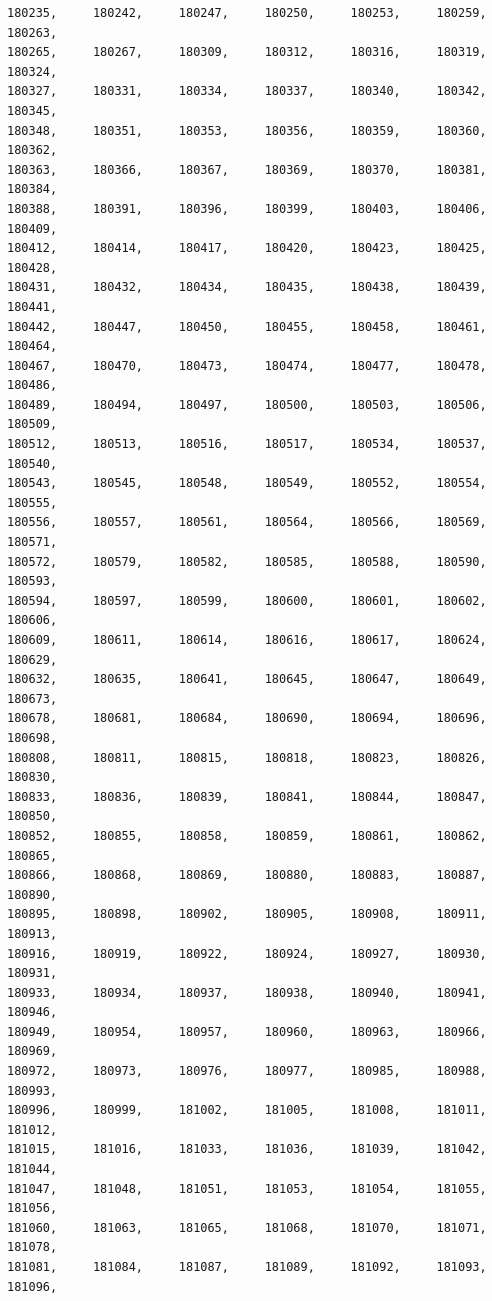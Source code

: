 \documentclass[a4paper,11pt]{report}
\begin{document}
\begin{verbatim}
180235,     180242,     180247,     180250,     180253,     180259,     180263,
180265,     180267,     180309,     180312,     180316,     180319,     180324,
180327,     180331,     180334,     180337,     180340,     180342,     180345,
180348,     180351,     180353,     180356,     180359,     180360,     180362,
180363,     180366,     180367,     180369,     180370,     180381,     180384,
180388,     180391,     180396,     180399,     180403,     180406,     180409,
180412,     180414,     180417,     180420,     180423,     180425,     180428,
180431,     180432,     180434,     180435,     180438,     180439,     180441,
180442,     180447,     180450,     180455,     180458,     180461,     180464,
180467,     180470,     180473,     180474,     180477,     180478,     180486,
180489,     180494,     180497,     180500,     180503,     180506,     180509,
180512,     180513,     180516,     180517,     180534,     180537,     180540,
180543,     180545,     180548,     180549,     180552,     180554,     180555,
180556,     180557,     180561,     180564,     180566,     180569,     180571,
180572,     180579,     180582,     180585,     180588,     180590,     180593,
180594,     180597,     180599,     180600,     180601,     180602,     180606,
180609,     180611,     180614,     180616,     180617,     180624,     180629,
180632,     180635,     180641,     180645,     180647,     180649,     180673,
180678,     180681,     180684,     180690,     180694,     180696,     180698,
180808,     180811,     180815,     180818,     180823,     180826,     180830,
180833,     180836,     180839,     180841,     180844,     180847,     180850,
180852,     180855,     180858,     180859,     180861,     180862,     180865,
180866,     180868,     180869,     180880,     180883,     180887,     180890,
180895,     180898,     180902,     180905,     180908,     180911,     180913,
180916,     180919,     180922,     180924,     180927,     180930,     180931,
180933,     180934,     180937,     180938,     180940,     180941,     180946,
180949,     180954,     180957,     180960,     180963,     180966,     180969,
180972,     180973,     180976,     180977,     180985,     180988,     180993,
180996,     180999,     181002,     181005,     181008,     181011,     181012,
181015,     181016,     181033,     181036,     181039,     181042,     181044,
181047,     181048,     181051,     181053,     181054,     181055,     181056,
181060,     181063,     181065,     181068,     181070,     181071,     181078,
181081,     181084,     181087,     181089,     181092,     181093,     181096,

\end{verbatim}
\end{document}
